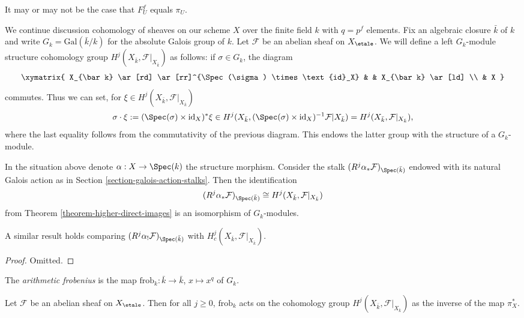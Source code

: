 \begin{remark}
\label{remark-may-be-confusing}
It may or may not be the case that $F^f_U$ equals $\pi_U$.
\end{remark}

\noindent
We continue discussion cohomology of sheaves on our scheme $X$ over
the finite field $k$ with $q = p^f$ elements.
Fix an algebraic closure $\bar k$ of $k$ and write $G_k =
\text{Gal}(\bar k/k)$ for the absolute Galois group of $k$.
Let $\mathcal{F}$ be an abelian sheaf on $X_\etale$.
We will define a left $G_k$-module structure
cohomology group $H^j (X_{\bar k}, \mathcal{F}|_{X_{\bar k}})$
as follows: if $\sigma \in G_k$, the diagram
$$
\xymatrix{
X_{\bar k} \ar[rd] \ar[rr]^{\Spec(\sigma) \times \text{id}_X} & &
X_{\bar k} \ar[ld] \\
& X
}
$$
commutes. Thus we can set, for $\xi \in H^j (X_{\bar k}, \mathcal{F}|_{X_{\bar
k}})$
$$
\sigma \cdot \xi := (\Spec(\sigma) \times \text{id}_X)^*\xi \in
H^j(X_{\bar k}, (\Spec(\sigma) \times \text{id}_X)^{-1}
\mathcal{F}|{X_{\bar k}})
= H^j (X_{\bar k}, \mathcal{F}|_{X_{\bar k}}),
$$
where the last equality follows from the commutativity of the previous diagram.
This endows the latter group with the structure of a $G_k$-module.

\begin{lemma}
\label{lemma-two-actions-agree}
In the situation above denote $\alpha : X \to \Spec(k)$ the structure morphism.
Consider the stalk $(R^j\alpha_*\mathcal{F})_{\Spec(\bar k)}$ endowed with its
natural Galois action as in Section \ref{section-galois-action-stalks}. Then
the identification
$$
(R^j\alpha_*\mathcal{F})_{\Spec(\bar k)} \cong H^j (X_{\bar k},
\mathcal{F}|_{X_{\bar k}})
$$
from Theorem \ref{theorem-higher-direct-images} is an isomorphism of
$G_k$-modules.
\end{lemma}

\noindent
A similar result holds comparing
$(R^j\alpha_!\mathcal{F})_{\Spec(\bar k)}$ with
$H^j_c (X_{\bar k}, \mathcal{F}|_{X_{\bar k}})$.

\begin{proof}
Omitted.
\end{proof}

\begin{definition}
\label{definition-arithmetic-frobenius}
The {\it arithmetic frobenius} is the map
$\text{frob}_k : \bar k \to \bar k$, $x \mapsto x^q$ of $G_k$.
\end{definition}

\begin{theorem}
\label{theorem-geometric-arithmetic-inverse}
Let $\mathcal{F}$ be an abelian sheaf on $X_\etale$. Then for all
$j\geq 0$, $\text{frob}_k$ acts on the cohomology group $H^j(X_{\bar k},
\mathcal{F}|_{X_{\bar k}})$ as the inverse of the map $\pi_X^*$.
\end{theorem}

